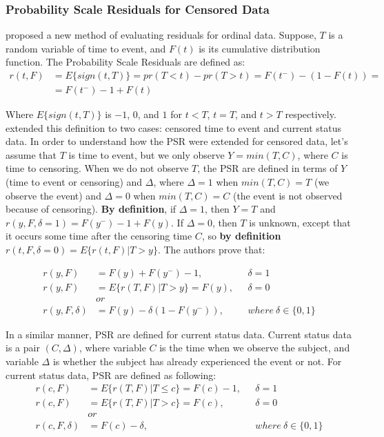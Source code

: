 \documentclass[]{article}
\begin{document}
\subsubsection{Probability Scale Residuals for Censored Data}

\cite{li2012new} proposed a new method of evaluating residuals for ordinal data. Suppose, $T$ is a random variable of time to event, and $F(t)$ is its cumulative distribution function. The Probability Scale Residuals are defined as:\\
$$
\begin{aligned}
	r(t,F) &= E\{sign(t,T)\} = pr(T < t) - pr(T > t) = F(t^-) - (1-F(t)) =\\
	 &=F(t^-) - 1 + F(t)
	\end{aligned}
$$

Where $E\{sign(t,T)\}$ is $-1$, $0$, and $1$ for $t<T$, $t=T$, and $t>T$ respectively.
\cite{shepherd2016probability} extended this definition to two cases: censored time to event and current status data. In order to understand how the PSR were extended for censored data, let's assume that $T$ is time to event, but we only observe $Y = min(T, C)$, where $C$ is time to censoring. When we do not observe $T$, the PSR are defined in terms of $Y$ (time to event or censoring) and $\Delta$, where $\Delta = 1$ when $min(T, C)=T$ (we observe the event) and $\Delta =0$ when $min(T, C)=C$ (the event is not observed because of censoring). \textbf{By definition}, if $\Delta = 1$, then $Y=T$ and $r(y,F, \delta=1) = F(y^-) - 1 + F(y)$. If $\Delta = 0$, then $T$ is unknown, except that it occurs some time after the censoring time $C$, so \textbf{by definition} $r(t,F, \delta=0) = E\{r(t,F)|T>y\}$. The authors prove that:

	$$
	\begin{aligned}
		r(y, F) &= F(y) + F(y^-) - 1,~~~&\delta = 1 \\
		r(y, F) &= E\{r(T,F)|T>y\} = F(y) ,~~~&\delta = 0 \\
		&or\\
    r(y, F, \delta) &= F(y) - \delta(1 - F(y^-)),~~~&where~\delta \in \{0,1\}
	\end{aligned}
	$$

In a similar manner, PSR are defined for current status data. Current status data is a pair $(C, \Delta)$, where variable $C$ is the time when we observe the subject, and variable $\Delta$ is whether the subject has already experienced the event or not. For current status data, PSR are defined as following:
	$$
	\begin{aligned}
		r(c, F) &= E\{r(T,F)|T\leq c\} = F(c) - 1,~~~&\delta = 1 \\
		r(c, F) &= E\{r(T,F)|T>c\} = F(c) ,~~~&\delta = 0 \\
		&or\\
    r(c, F, \delta) &= F(c) - \delta,~~~&where~\delta \in \{0,1\}\\
	\end{aligned}
	$$
\end{document}
